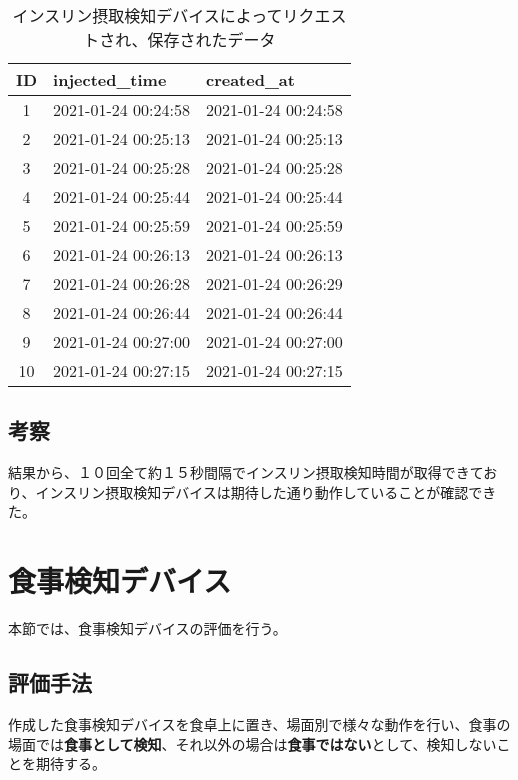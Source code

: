\begin{table}[htbp]
  \caption{インスリン摂取検知デバイスによってリクエストされ、保存されたデータ}
  \label{tb:insulin_detection_time}
  \begin{center}
    \begin{tabular}{|c||l|l|}
      \hline
      ID & injected\_time & created\_at \\\hline
      1 & 2021-01-24 00:24:58 & 2021-01-24 00:24:58 \\\hline
      2 & 2021-01-24 00:25:13 & 2021-01-24 00:25:13 \\\hline
      3 & 2021-01-24 00:25:28 & 2021-01-24 00:25:28 \\\hline
      4 & 2021-01-24 00:25:44 & 2021-01-24 00:25:44 \\\hline
      5 & 2021-01-24 00:25:59 & 2021-01-24 00:25:59 \\\hline
      6 & 2021-01-24 00:26:13 & 2021-01-24 00:26:13 \\\hline
      7 & 2021-01-24 00:26:28 & 2021-01-24 00:26:29 \\\hline
      8 & 2021-01-24 00:26:44 & 2021-01-24 00:26:44 \\\hline
      9 & 2021-01-24 00:27:00 & 2021-01-24 00:27:00 \\\hline
      10 & 2021-01-24 00:27:15 & 2021-01-24 00:27:15 \\\hline
    \end{tabular}
  \end{center}
\end{table}

\subsection{考察}

結果から、１０回全て約１５秒間隔でインスリン摂取検知時間が取得できており、インスリン摂取検知デバイスは期待した通り動作していることが確認できた。

\section{食事検知デバイス}

本節では、食事検知デバイスの評価を行う。

\subsection{評価手法}
作成した食事検知デバイスを食卓上に置き、場面別で様々な動作を行い、食事の場面では\textbf{食事として検知}、それ以外の場合は\textbf{食事ではない}として、検知しないことを期待する。

